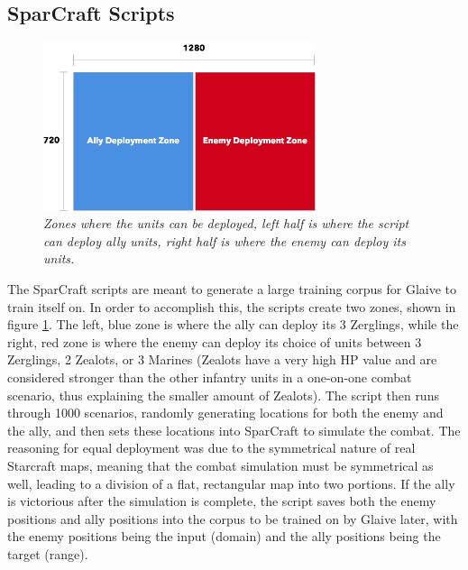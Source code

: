 \documentclass[twocolumn]{article}
\begin{document}
\subsection{SparCraft Scripts}
\begin{figure}[ht]
	\begin{center}
		\includegraphics[width=8cm]{deploymentZones.png}
	\end{center}
	\caption{\textit{Zones where the units can be deployed, left half is where the script can deploy ally units, right half is where the enemy can deploy its units. }}
	\label{fig:zones}
\end{figure}
The SparCraft scripts are meant to generate a large training corpus for Glaive to train itself on. In order to accomplish this, the scripts create two zones, shown in figure \ref{fig:zones}. The left, blue zone is where the ally can deploy its 3 Zerglings, while the right, red zone is where the enemy can deploy its choice of units between 3 Zerglings, 2 Zealots, or 3 Marines (Zealots have a very high HP value and are considered stronger than the other infantry units in a one-on-one combat scenario, thus explaining the smaller amount of Zealots). The script then runs through 1000 scenarios, randomly generating locations for both the enemy and the ally, and then sets these locations into SparCraft to simulate the combat. The reasoning for equal deployment was due to the symmetrical nature of real Starcraft maps, meaning that the combat simulation must be symmetrical as well, leading to a division of a flat, rectangular map into two portions. If the ally is victorious after the simulation is complete, the script saves both the enemy positions and ally positions into the corpus to be trained on by Glaive later, with the enemy positions being the input (domain) and the ally positions being the target (range).
\end{document}
